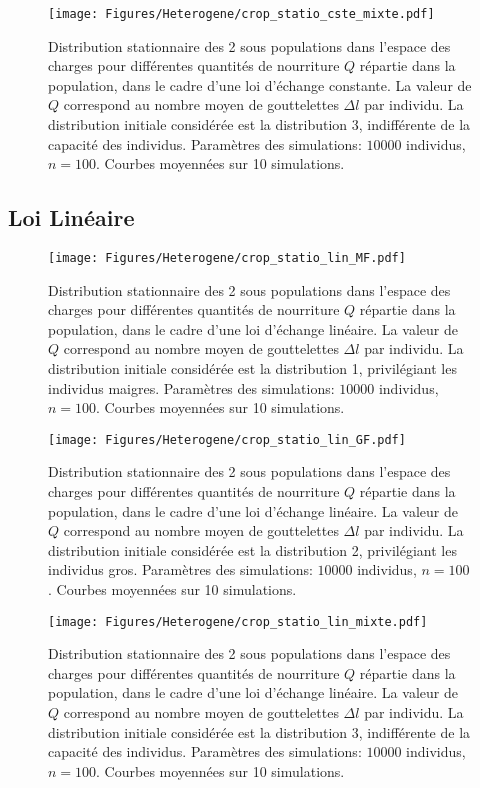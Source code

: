 \begin{figure}[h!]
\centering
\texttt{[image: Figures/Heterogene/crop\_statio\_cste\_mixte.pdf]}
\caption{Distribution stationnaire des 2 sous populations dans l'espace des charges pour différentes quantités de nourriture $Q$ répartie dans la population, dans le cadre d'une loi d'échange constante. La valeur de $Q$ correspond au nombre moyen de gouttelettes $\Delta l$ par individu. La distribution initiale considérée est la distribution 3, indifférente de la capacité des individus. Paramètres des simulations: $10000$ individus, $n=100$. Courbes moyennées sur 10 simulations.}
\label{statio_cste_mixte}
\end{figure}


\pagebreak
\subsection{Loi Linéaire}

\begin{figure}[h!]
\centering
\texttt{[image: Figures/Heterogene/crop\_statio\_lin\_MF.pdf]}
\caption{Distribution stationnaire des 2 sous populations dans l'espace des charges pour différentes quantités de nourriture $Q$ répartie dans la population, dans le cadre d'une loi d'échange linéaire. La valeur de $Q$ correspond au nombre moyen de gouttelettes $\Delta l$ par individu. La distribution initiale considérée est la distribution 1, privilégiant les individus maigres. Paramètres des simulations: $10000$ individus, $n=100$. Courbes moyennées sur 10 simulations.}
\label{statio_lin_MF}
\end{figure}

\begin{figure}[h!]
\centering
\texttt{[image: Figures/Heterogene/crop\_statio\_lin\_GF.pdf]}
\caption{Distribution stationnaire des 2 sous populations dans l'espace des charges pour différentes quantités de nourriture $Q$ répartie dans la population, dans le cadre d'une loi d'échange linéaire. La valeur de $Q$ correspond au nombre moyen de gouttelettes $\Delta l$ par individu. La distribution initiale considérée est la distribution 2, privilégiant les individus gros. Paramètres des simulations: $10000$ individus, $n=100$. Courbes moyennées sur 10 simulations.}
\label{statio_lin_GF}
\end{figure}

\begin{figure}[h!]
\centering
\texttt{[image: Figures/Heterogene/crop\_statio\_lin\_mixte.pdf]}
\caption{Distribution stationnaire des 2 sous populations dans l'espace des charges pour différentes quantités de nourriture $Q$ répartie dans la population, dans le cadre d'une loi d'échange linéaire. La valeur de $Q$ correspond au nombre moyen de gouttelettes $\Delta l$ par individu. La distribution initiale considérée est la distribution 3, indifférente de la capacité des individus. Paramètres des simulations: $10000$ individus, $n=100$. Courbes moyennées sur 10 simulations.}
\label{statio_lin_mixte}
\end{figure}

